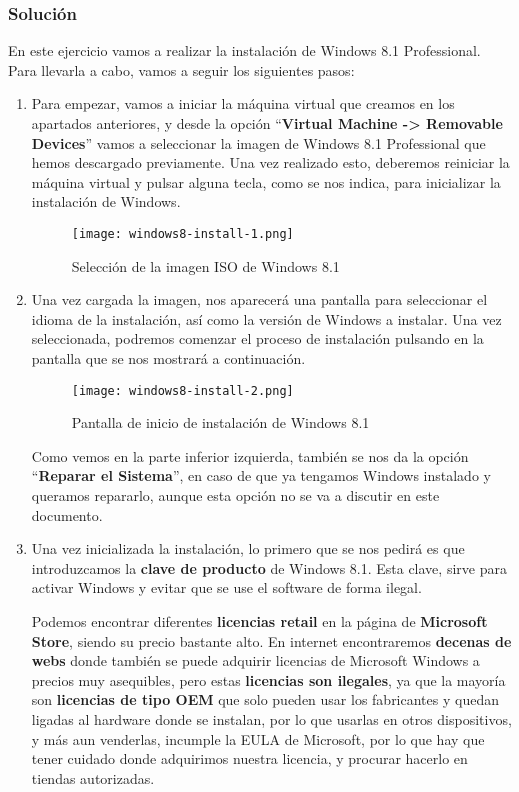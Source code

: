 \subsubsection{Solución}
En este ejercicio vamos a realizar la instalación de Windows 8.1 Professional. Para llevarla a cabo, vamos a seguir los siguientes pasos:

\begin{enumerate}
    \item Para empezar, vamos a iniciar la máquina virtual que creamos en los apartados anteriores, y desde la opción ``\textbf{Virtual Machine -> Removable Devices}'' vamos a seleccionar la imagen de Windows 8.1 Professional que hemos descargado previamente. Una vez realizado esto, deberemos reiniciar la máquina virtual y pulsar alguna tecla, como se nos indica, para inicializar la instalación de Windows.

    \begin{figure}[H]
        \centering
        \texttt{[image: windows8-install-1.png]}
        \caption{Selección de la imagen ISO de Windows 8.1}
    \end{figure}

    \item Una vez cargada la imagen, nos aparecerá una pantalla para seleccionar el idioma de la instalación, así como la versión de Windows a instalar. Una vez seleccionada, podremos comenzar el proceso de instalación pulsando en la pantalla que se nos mostrará a continuación.

    \begin{figure}[H]
        \centering
        \texttt{[image: windows8-install-2.png]}
        \caption{Pantalla de inicio de instalación de Windows 8.1}
    \end{figure}

    Como vemos en la parte inferior izquierda, también se nos da la opción ``\textbf{Reparar el Sistema}'', en caso de que ya tengamos Windows instalado y queramos repararlo, aunque esta opción no se va a discutir en este documento.

    \item Una vez inicializada la instalación, lo primero que se nos pedirá es que introduzcamos la \textbf{clave de producto} de Windows 8.1. Esta clave, sirve para activar Windows y evitar que se use el software de forma ilegal.

    Podemos encontrar diferentes \textbf{licencias retail} en la página de \textbf{Microsoft Store}, siendo su precio bastante alto. En internet encontraremos \textbf{decenas de webs} donde también se puede adquirir licencias de Microsoft Windows a precios muy asequibles, pero estas \textbf{licencias son ilegales}, ya que la mayoría son \textbf{licencias de tipo OEM} que solo pueden usar los fabricantes y quedan ligadas al hardware donde se instalan, por lo que usarlas en otros dispositivos, y más aun venderlas, incumple la EULA de Microsoft, por lo que hay que tener cuidado donde adquirimos nuestra licencia, y procurar hacerlo en tiendas autorizadas.


\end{enumerate}
